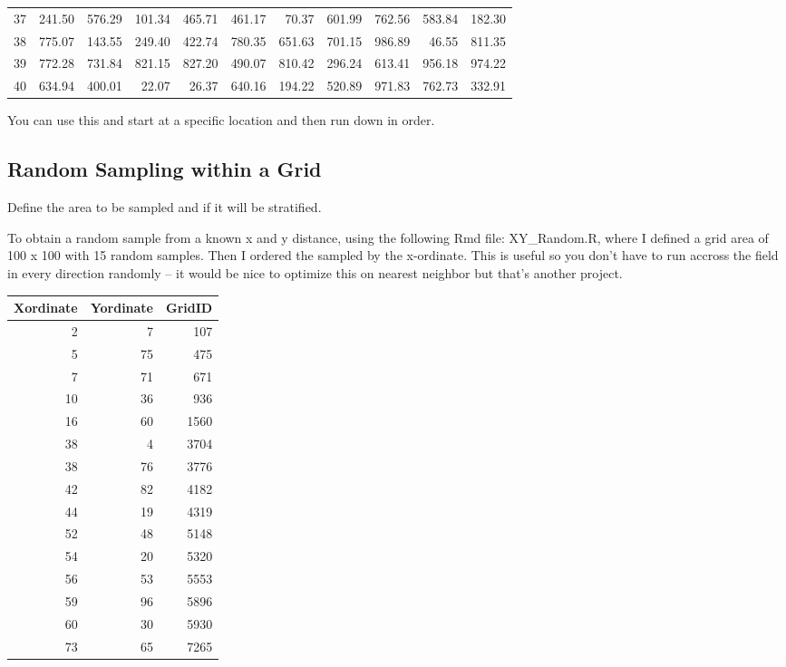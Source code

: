 \documentclass[12pt]{../SOP3_beta}\usepackage[]{graphicx}\usepackage[]{color}
\begin{document}
\begin{table}[ht]
\begin{tabular}{rrrrrrrrrrr}
  37 & 241.50 & 576.29 & 101.34 & 465.71 & 461.17 & 70.37 & 601.99 & 762.56 & 583.84 & 182.30 \\ 
  38 & 775.07 & 143.55 & 249.40 & 422.74 & 780.35 & 651.63 & 701.15 & 986.89 & 46.55 & 811.35 \\ 
  39 & 772.28 & 731.84 & 821.15 & 827.20 & 490.07 & 810.42 & 296.24 & 613.41 & 956.18 & 974.22 \\ 
  40 & 634.94 & 400.01 & 22.07 & 26.37 & 640.16 & 194.22 & 520.89 & 971.83 & 762.73 & 332.91 \\ 
   \hline
\end{tabular}
\label{tab:randomnumbers}
\end{table}


\NP You can use this and start at a specific location and then run down in order.



\subsection{Random Sampling within a Grid}
\NP Define the area to be sampled and if it will be stratified. 

\NP To obtain a random sample from a known x and y distance, using the following Rmd file: XY\_Random.R, where I defined a grid area of 100 x 100 with 15 random samples. Then I ordered the sampled by the x-ordinate. This is useful so you don't have to run accross the field in every direction randomly -- it would be nice to optimize this on nearest neighbor but that's another project.



\begin{table}[H]
\centering
\begin{tabular}{rrr}
  \hline
Xordinate & Yordinate & GridID \\ 
  \hline
  2 &   7 & 107 \\ 
    5 &  75 & 475 \\ 
    7 &  71 & 671 \\ 
   10 &  36 & 936 \\ 
   16 &  60 & 1560 \\ 
   38 &   4 & 3704 \\ 
   38 &  76 & 3776 \\ 
   42 &  82 & 4182 \\ 
   44 &  19 & 4319 \\ 
   52 &  48 & 5148 \\ 
   54 &  20 & 5320 \\ 
   56 &  53 & 5553 \\ 
   59 &  96 & 5896 \\ 
   60 &  30 & 5930 \\ 
   73 &  65 & 7265 \\ 
   \hline
\end{tabular}
\end{table}
\end{document}
